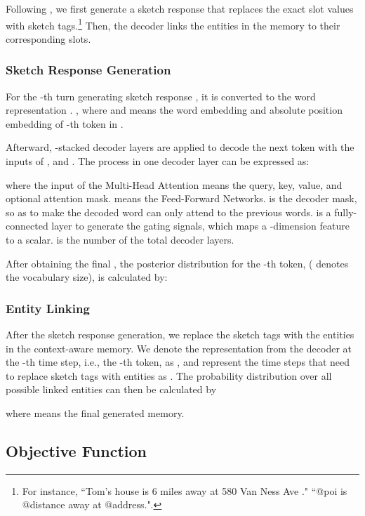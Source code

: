 \documentclass[11pt]{article}
\begin{document}
Following \cite{wu2018globaltolocal,qin-etal-2020-dynamic, yang-etal-2020-graphdialog}, we first generate a sketch response that replaces the exact slot values with sketch tags.\footnote{For instance, ``Tom’s house is 6 miles away at 580 Van Ness Ave ."  ``@poi is @distance away at @address.".} Then, the decoder links the entities in the memory to their corresponding slots.

\subsubsection{Sketch Response Generation}
\label{sssec:sketch_reponse}

For the -th turn generating sketch response , it is converted to the word representation .
, where  and  means the word embedding and absolute position embedding of -th token in .

Afterward, -stacked decoder layers are applied to decode the next token with the inputs of ,  and . The process in one decoder layer can be expressed as:

where the input  of the Multi-Head Attention  means the query, key, value, and optional attention mask.  means the Feed-Forward Networks.  is the decoder mask, so as to make the decoded word can only attend to the previous words.
 is a fully-connected layer to generate the gating signals, which maps a -dimension feature to a scalar.  is the number of the total decoder layers.

After obtaining the final , the posterior distribution for the -th token,  ( denotes the vocabulary size), is calculated by:




\subsubsection{Entity Linking}
\label{ssec:linking}

After the sketch response generation, we replace the sketch tags with the entities in the context-aware memory. We denote the representation from the decoder at the -th time step, i.e., the -th token, as , and represent the time steps that need to replace sketch tags with entities as . The probability distribution over all possible linked entities can then be calculated by 

where  means the final generated memory.


\subsection{Objective Function}
\end{document}

